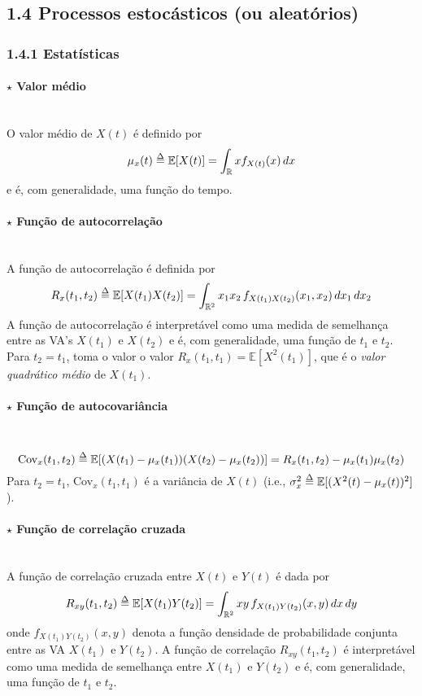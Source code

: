 \subsection{1.4 Processos estocásticos (ou aleatórios)}
\label{subsec:stochastic-processes}
\subsubsection{1.4.1 Estatísticas}
\paragraph[1.4.1.1 Valor médio]{$\pmb{\star}$ Valor médio}\mbox{}\\
O valor médio de $X(t)$ é definido por
$$
    \mu_x(t) \delequal \mathbb{E}[X(t)] = \int_{\mathbb{R}} x f_{X(t)}(x)\,dx
$$
e é, com generalidade, uma função do tempo.
\paragraph[1.4.1.2 Função de autocorrelação]{$\pmb{\star}$ Função de autocorrelação}\mbox{}\\
A função de autocorrelação é definida por
$$
    R_x(t_1, t_2) \delequal \mathbb{E}[X(t_1)X(t_2)] = \int_{\mathbb{R}^2} x_1 x_2\, f_{X(t_1)X(t_2)}(x_1, x_2)\,dx_1\, dx_2
$$
A função de autocorrelação é interpretável como uma medida de semelhança entre as VA's $X(t_1)$ e $X(t_2)$ e é, com generalidade, uma função de $t_1$ e $t_2$. Para $t_2 = t_1$, toma o valor o valor $R_x(t_1,t_1) = \mathbb{E}[X^2(t_1)]$, que é o \textit{valor quadrático médio} de $X(t_1)$.
\paragraph[1.4.1.3 Função de autocovariância]{$\pmb{\star}$ Função de autocovariância}\mbox{}\\
$$
    \text{Cov}_x(t_1, t_2) \delequal \mathbb{E}[(X(t_1) - \mu_x(t_1))(X(t_2) - \mu_x(t_2))] = R_x(t_1,t_2) - \mu_x(t_1)\mu_x(t_2)
$$
Para $t_2 = t_1$, Cov$_x(t_1,t_1)$ é a variância de $X(t)$ (i.e., $\sigma_x^{2} \delequal \mathbb{E}[(X^2(t) - \mu_x(t))^2]$).
\paragraph[1.4.1.4 Função de correlação cruzada]{$\pmb{\star}$ Função de correlação cruzada}\mbox{}\\
A função de correlação cruzada entre $X(t)$ e $Y(t)$ é dada por
$$
    R_{xy}(t_1,t_2) \delequal \mathbb{E}[X(t_1) Y(t_2)] = \int_{\mathbb{R}^2} x y\, f_{X(t_1)Y(t_2)}(x, y)\,dx\, dy
$$
onde $f_{X(t_1)Y(t_2)}(x,y)$ denota a função densidade de probabilidade conjunta entre as VA $X(t_1)$ e $Y(t_2)$. A função de correlação $R_{xy}(t_1,t_2)$ é interpretável como uma medida de semelhança entre $X(t_1)$ e $Y(t_2)$ e é, com generalidade, uma função de $t_1$ e $t_2$.
